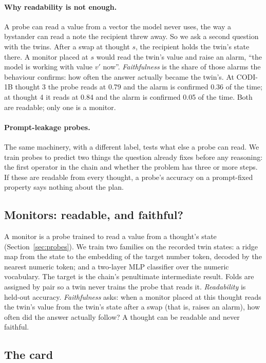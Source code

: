 \documentclass{article}
\begin{document}
\paragraph{Why readability is not enough.} A probe can read a value from a vector the model never uses, the way a bystander can read a note the recipient threw away. So we ask a second question with the twins. After a swap at thought $s$, the recipient holds the twin's state there. A monitor placed at $s$ would read the twin's value and raise an alarm, ``the model is working with value $v'$ now''. \emph{Faithfulness} is the share of those alarms the behaviour confirms: how often the answer actually became the twin's. At CODI-1B thought 3 the probe reads at 0.79 and the alarm is confirmed 0.36 of the time; at thought 4 it reads at 0.84 and the alarm is confirmed 0.05 of the time. Both are readable; only one is a monitor.

\paragraph{Prompt-leakage probes.} The same machinery, with a different label, tests what else a probe can read. We train probes to predict two things the question already fixes before any reasoning: the first operator in the chain and whether the problem has three or more steps. If these are readable from every thought, a probe's accuracy on a prompt-fixed property says nothing about the plan.

\subsection{Monitors: readable, and faithful?}

A monitor is a probe trained to read a value from a thought's state (Section~\ref{sec:probes}). We train two families on the recorded twin states: a ridge map from the state to the embedding of the target number token, decoded by the nearest numeric token; and a two-layer MLP classifier over the numeric vocabulary. The target is the chain's penultimate intermediate result. Folds are assigned by pair so a twin never trains the probe that reads it. \emph{Readability} is held-out accuracy. \emph{Faithfulness} asks: when a monitor placed at this thought reads the twin's value from the twin's state after a swap (that is, raises an alarm), how often did the answer actually follow? A thought can be readable and never faithful.

\subsection{The card}\label{sec:card}
\end{document}
